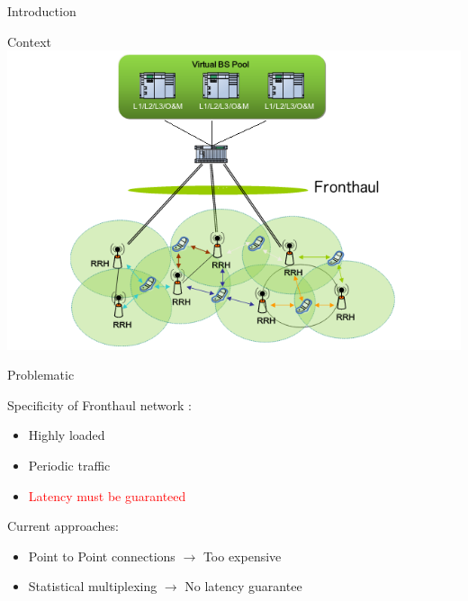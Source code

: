 \documentclass[10 pt]{beamer}
\begin{document}
\begin{section}{Introduction}
\begin{frame}{Context}
  \centering
  \includegraphics[scale=0.5]{CRAN}\\
  
\end{frame}

\begin{frame}{Problematic}
  \centering
  
  
 \begin{multicols}{2}
Specificity of Fronthaul network :
\vspace{1cm}
\begin{itemize}
\item Highly loaded
\item Periodic traffic
\item \textcolor{red}{Latency must be guaranteed}
\end{itemize}
\vspace{0.5cm}
Current approaches: \begin{itemize}
\vspace{1cm}
\item Point to Point connections $\rightarrow$ Too expensive
\item Statistical multiplexing $\rightarrow$ No latency guarantee
\end{itemize}
\end{multicols}

\end{frame}

\end{section}
\end{document}
